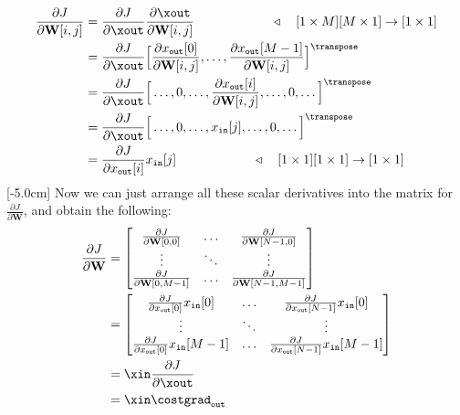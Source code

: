 \begin{align}
    \frac{\partial J}{\partial \mathbf{W}[i,j]} 
        &= \frac{\partial J}{\partial \xout} \frac{\partial \xout}{\partial \mathbf{W}[i,j]} \quad\quad\quad\quad\quad\quad \triangleleft \quad[1 \times M][M \times 1] \rightarrow [1 \times 1]\\
        &= \frac{\partial J}{\partial \xout} \Big[\frac{\partial x_{\texttt{out}}[0]}{\partial \mathbf{W}[i,j]}, \ldots ,\frac{\partial x_{\texttt{out}}[M-1]}{\partial \mathbf{W}[i,j]} \Big]^\transpose \\
        &= \frac{\partial J}{\partial \xout} \Big[\ldots , 0, \ldots , \frac{\partial x_{\texttt{out}}[i]}{\partial \mathbf{W}[i,j]}, \ldots, 0, \ldots \Big]^\transpose \\
        &= \frac{\partial J}{\partial \xout} \Big[\ldots , 0, \ldots , x_{\texttt{in}}[j], \ldots, 0, \ldots \Big]^\transpose \\
        &= \frac{\partial J}{\partial x_{\texttt{out}}[i]}x_{\texttt{in}}[j] \quad\quad\quad\quad\quad\quad \triangleleft \quad[1 \times 1][1 \times 1] \rightarrow [1 \times 1]
\end{align}
[-5.0cm]
Now we can just arrange all these scalar derivatives into the matrix for $\frac{\partial J}{\partial \mathbf{W}}$, and obtain the following:
\begin{align}
    \frac{\partial J}{\partial \mathbf{W}} & = 
        \begin{bmatrix}
            \frac{\partial J}{\partial \mathbf{W}[0,0]} & \ldots & \frac{\partial J}{\partial \mathbf{W}[N-1,0]} \\
            \vdots & \ddots & \vdots \\
            \frac{\partial J}{\partial \mathbf{W}[0,M-1]} & \ldots & \frac{\partial J}{\partial \mathbf{W}[N-1,M-1]} \\
        \end{bmatrix}\\
        & = 
        \begin{bmatrix}
            \frac{\partial J}{\partial x_{\texttt{out}}[0]}x_{\texttt{in}}[0] & \ldots & \frac{\partial J}{\partial x_{\texttt{out}}[N-1]}x_{\texttt{in}}[0] \\
            \vdots & \ddots & \vdots \\
            \frac{\partial J}{\partial x_{\texttt{out}}[0]}x_{\texttt{in}}[M-1] & \ldots & \frac{\partial J}{\partial x_{\texttt{out}}[N-1]}x_{\texttt{in}}[M-1] \\
        \end{bmatrix}\\
        & = \xin \frac{\partial J}{\partial \xout}\\
        &= \xin \costgrad_{\texttt{out}}
\end{align}
